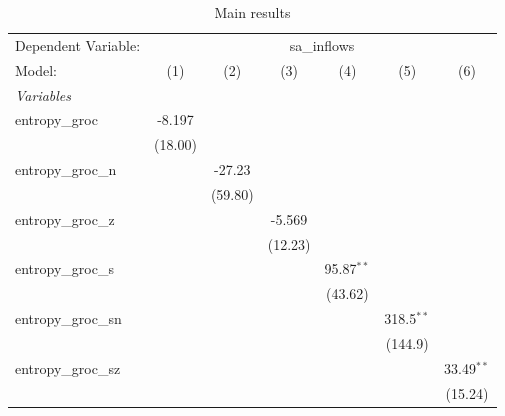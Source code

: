 
\begin{table}[htbp]
   \centering
   \footnotesize
   \begin{threeparttable}[b]
      \caption{\label{tab:reg_sa_inflows_groc.tex} Main results}
      \begin{tabular}{lcccccc}
         \tabularnewline \midrule \midrule
         Dependent Variable: & \multicolumn{6}{c}{sa\_inflows}\\
         Model:              & (1)            & (2)            & (3)            & (4)            & (5)            & (6)\\  
         \midrule
         \emph{Variables}\\
         entropy\_groc       & -8.197         &                &                &                &                &   \\   
                             & (18.00)        &                &                &                &                &   \\   
         entropy\_groc\_n    &                & -27.23         &                &                &                &   \\   
                             &                & (59.80)        &                &                &                &   \\   
         entropy\_groc\_z    &                &                & -5.569         &                &                &   \\   
                             &                &                & (12.23)        &                &                &   \\   
         entropy\_groc\_s    &                &                &                & 95.87$^{**}$   &                &   \\   
                             &                &                &                & (43.62)        &                &   \\   
         entropy\_groc\_sn   &                &                &                &                & 318.5$^{**}$   &   \\   
                             &                &                &                &                & (144.9)        &   \\   
         entropy\_groc\_sz   &                &                &                &                &                & 33.49$^{**}$\\   
                             &                &                &                &                &                & (15.24)\\   

\end{tabular}
\end{threeparttable}
\end{table}

